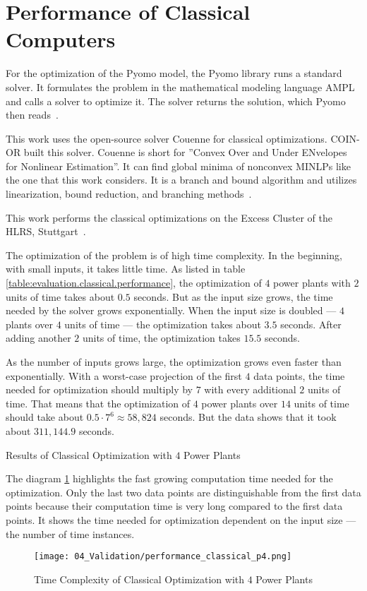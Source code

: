\section{Performance of Classical Computers}

For the optimization of the Pyomo model, the Pyomo library runs a standard solver.
It formulates the problem in the mathematical modeling language AMPL
and calls a solver to optimize it.
The solver returns the solution, which Pyomo then reads~\cite{PyomoAMPL}.

This work uses the open-source solver Couenne for classical optimizations.
COIN-OR built this solver.
Couenne is short for ''Convex Over and Under ENvelopes for Nonlinear Estimation''.
It can find global minima of nonconvex MINLPs like the one that this work considers.
It is a branch and bound algorithm and utilizes linearization, bound reduction, and branching methods~\cite{Belotti2009, CoinorHome, CouenneRepo}.

This work performs the classical optimizations on the Excess Cluster of the HLRS, Stuttgart~\cite{ExcessHLRS, HLRS}.

The optimization of the problem is of high time complexity.
In the beginning, with small inputs, it takes little time.
As listed in table \ref{table:evaluation.classical.performance}, the optimization of $4$ power plants with $2$ units of time takes about $0.5$ seconds.
But as the input size grows, the time needed by the solver grows exponentially.
When the input size is doubled --- $4$ plants over $4$ units of time --- the optimization takes about $3.5$ seconds.
After adding another $2$ units of time, the optimization takes $15.5$ seconds.

As the number of inputs grows large, the optimization grows even faster than exponentially.
With a worst-case projection of the first $4$ data points, the time needed for optimization should multiply by $7$ with every additional $2$ units of time.
That means that the optimization of $4$ power plants over $14$ units of time should take about $0.5 \cdot 7^6 \approx 58,824$ seconds.
But the data shows that it took about $311,144.9$ seconds.

\begin{table}[ht]
  \centering
  
  \caption{Results of Classical Optimization with $4$ Power Plants}
  \label{table:evaluation.classical.performance}
\end{table}

The diagram \ref{figure:evaluation.classical.performance} highlights the fast growing computation time needed for the optimization.
Only the last two data points are distinguishable from the first data points because their computation time is very long compared to the first data points.
It shows the time needed for optimization dependent on the input size --- the number of time instances.

\begin{figure}[ht]
  \centering
  \texttt{[image: 04\_Validation/performance\_classical\_p4.png]}
  \caption{Time Complexity of Classical Optimization with $4$ Power Plants}
  \label{figure:evaluation.classical.performance}
\end{figure}
